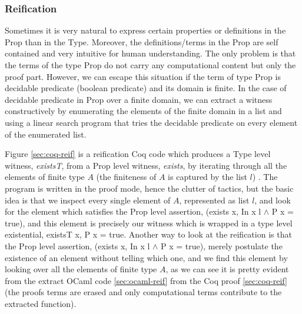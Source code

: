  
  
  \subsubsection{Reification}
  \label{sec:reification}
  Sometimes it is very natural to express certain properties or definitions
  in the Prop than in the Type.  Moreover, the definitions/terms in the Prop are self contained and 
  very intuitive for human understanding. The only problem is that the terms of the type Prop do not carry any 
  computational content but only the proof part.  However, 
  we can escape this situation if the term of type Prop is decidable predicate (boolean predicate) and its domain is finite. 
  In the case of decidable predicate in Prop over a finite domain,  we can extract 
  a witness constructively by enumerating the elements of the finite domain in a 
  list and using a linear search program that tries the decidable predicate on
  every element of the enumerated list. 
  
  
  Figure \ref{sec:coq-reif} is a
  reification Coq code 
  which produces a Type level witness, \textit{existsT},
  from a Prop level witness, \textit{exists}, by iterating 
  through all the elements of finite type $A$ (the finiteness 
  of $A$ is captured by the list $l$) \citep{10.1145/2808098.2808102}. The program is written 
  in the proof mode, hence the clutter of tactics, but the basic idea is that 
  we inspect every single element of  $A$, represented as list $l$, 
  and look for the element which satisfies the Prop level assertion, 
  (exists x, In x l  $\wedge$  P x = true), and this element is 
  precisely our witness which is wrapped in a type level existential,  
  existsT x, P x = true.  Another way to look at the  reification is that 
  the Prop level assertion, (exists x, In x l  $\wedge$  P x = true), 
  merely  postulate the existence of an element without telling which one, 
  and we find this element by looking over all the elements of finite type $A$, 
  as we can see it is pretty evident from the extract OCaml code \ref{sec:ocaml-reif} 
  from the Coq proof \ref{sec:coq-reif} 
  (the proofs terms are erased and only computational terms contribute to the 
   extracted function). 

